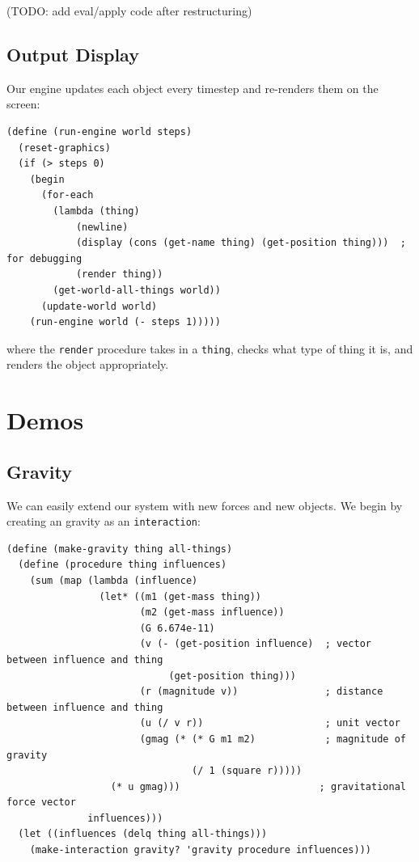 \documentclass{article}
\begin{document}
(TODO: add eval/apply code after restructuring)

\subsection{Output Display}

Our engine updates each object every timestep and re-renders them on the
screen:

\begin{verbatim}
(define (run-engine world steps)
  (reset-graphics)
  (if (> steps 0)
    (begin 
      (for-each 
        (lambda (thing)
            (newline)
            (display (cons (get-name thing) (get-position thing)))  ; for debugging
            (render thing))
        (get-world-all-things world))
      (update-world world)
    (run-engine world (- steps 1)))))
\end{verbatim}

where the \texttt{render} procedure takes in a \texttt{thing}, checks what type
of thing it is, and renders the object appropriately.

\section{Demos}
\subsection{Gravity}

We can easily extend our system with new forces and new objects. We begin by
creating an gravity as an \texttt{interaction}:

{\small\begin{verbatim}
(define (make-gravity thing all-things)
  (define (procedure thing influences)
    (sum (map (lambda (influence)
                (let* ((m1 (get-mass thing))
                       (m2 (get-mass influence))
                       (G 6.674e-11)
                       (v (- (get-position influence)  ; vector between influence and thing
                            (get-position thing)))
                       (r (magnitude v))               ; distance between influence and thing
                       (u (/ v r))                     ; unit vector
                       (gmag (* (* G m1 m2)            ; magnitude of gravity
                                (/ 1 (square r)))))
                  (* u gmag)))                        ; gravitational force vector
              influences)))
  (let ((influences (delq thing all-things)))
    (make-interaction gravity? 'gravity procedure influences)))
\end{verbatim}}
\end{document}
